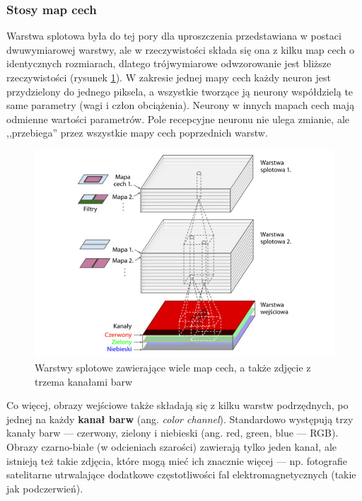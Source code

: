 \documentclass[12pt]{mwbk}
\theoremstyle{plain}
\theoremstyle{definition}
\theoremstyle{remark}
\newcommand\zrodlo[1]{\par\vspace{-3mm}{\small\textit{Źródło: }#1 }}
\begin{document}
\subsubsection{Stosy map cech}

Warstwa splotowa była do tej pory dla uproszczenia przedstawiana w postaci dwuwymiarowej warstwy, ale w rzeczywistości składa się ona z kilku map cech o identycznych rozmiarach, dlatego trójwymiarowe odwzorowanie jest bliższe rzeczywistości (rysunek \ref{fig:warstwy-kanaly}). W zakresie jednej mapy cech każdy neuron jest przydzielony do jednego piksela, a wszystkie tworzące ją neurony współdzielą te same parametry (wagi i człon obciążenia). Neurony w innych mapach cech mają odmienne wartości parametrów. Pole recepcyjne neuronu nie ulega zmianie, ale ,,przebiega'' przez wszystkie mapy cech poprzednich warstw. %

\begin{figure}[!h]
	\centering
	\includegraphics[width=\linewidth]{rys/warstwy_cnn_kanaly.png}
	\caption{Warstwy splotowe zawierające wiele map cech, a także zdjęcie z trzema kanałami barw}
	\zrodlo{\cite{geron}}
	\label{fig:warstwy-kanaly}
\end{figure}

Co więcej, obrazy wejściowe także składają się z kilku warstw podrzędnych, po jednej na każdy \textbf{kanał
barw} (ang. \emph{color channel}). Standardowo występują trzy kanały barw — czerwony, zielony i niebieski
(ang. red, green, blue — RGB). Obrazy czarno-białe (w odcieniach szarości) zawierają tylko jeden
kanał, ale istnieją też takie zdjęcia, które mogą mieć ich znacznie więcej — np. fotografie satelitarne
utrwalające dodatkowe częstotliwości fal elektromagnetycznych (takie jak podczerwień).
\end{document}
